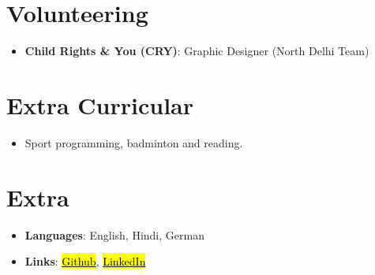 \documentclass[letterpaper,10.5pt]{article}
\newcommand{\resumeItem}[2]{
  \item\normalsize{
    \textbf{#1}{#2}
  }
}
\newcommand{\resumeSubItem}[2]{\resumeItem{#1}{#2}\vspace{-4pt}}
\newcommand{\resumeSubHeadingListStart}{\begin{itemize}[leftmargin=*]}
\newcommand{\resumeSubHeadingListEnd}{\end{itemize}}
\begin{document}
\section{Volunteering}
  \resumeSubHeadingListStart
        \resumeSubItem{Child Rights \& You (CRY)}
        {:    Graphic Designer (North Delhi Team)}
        
    \resumeSubHeadingListEnd
    
\section{Extra Curricular}
    \resumeSubHeadingListStart
        \resumeSubItem{}
        {Sport programming, badminton and reading.}
    
    \resumeSubHeadingListEnd
    
\section{Extra}
    \resumeSubHeadingListStart
        \resumeSubItem{Languages}
        {:    English, Hindi, German}
            
        \resumeSubItem{Links}
        {:    
        \href{https://github.com/prakashdanish}{\hl{Github}},         
        \href{https://www.linkedin.com/in/danishprakash/}{\hl{LinkedIn}}}
        
    \resumeSubHeadingListEnd
    
    
\end{document}
